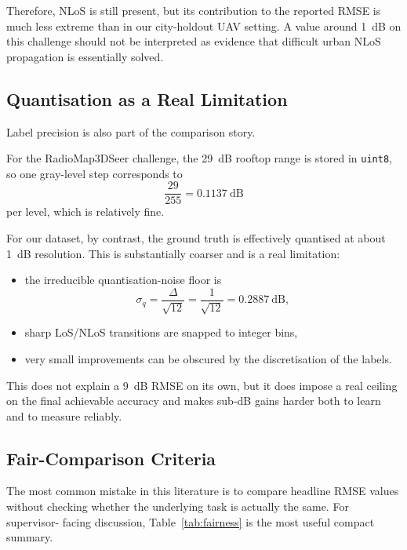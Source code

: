 \documentclass[11pt,a4paper]{article}
\begin{document}
Therefore, NLoS is still present, but its contribution to the reported RMSE is
much less extreme than in our city-holdout UAV setting. A value around 1~dB on
this challenge should not be interpreted as evidence that difficult urban NLoS
propagation is essentially solved.

\subsection{Quantisation as a Real Limitation}

Label precision is also part of the comparison story.

For the RadioMap3DSeer challenge, the 29~dB rooftop range is stored in
\texttt{uint8}, so one gray-level step corresponds to
\[
    \frac{29}{255} = 0.1137~\mathrm{dB}
\]
per level, which is relatively fine.

For our dataset, by contrast, the ground truth is effectively quantised at about
1~dB resolution. This is substantially coarser and is a real limitation:
\begin{itemize}[nosep]
    \item the irreducible quantisation-noise floor is
    \[
        \sigma_q = \frac{\Delta}{\sqrt{12}} = \frac{1}{\sqrt{12}} = 0.2887~\mathrm{dB},
    \]
    \item sharp LoS/NLoS transitions are snapped to integer bins,
    \item very small improvements can be obscured by the discretisation of the labels.
\end{itemize}

This does not explain a 9~dB RMSE on its own, but it does impose a real ceiling
on the final achievable accuracy and makes sub-dB gains harder both to learn and
to measure reliably.

\subsection{Fair-Comparison Criteria}

The most common mistake in this literature is to compare headline RMSE values
without checking whether the underlying task is actually the same. For supervisor-
facing discussion, Table~\ref{tab:fairness} is the most useful compact summary.
\end{document}
